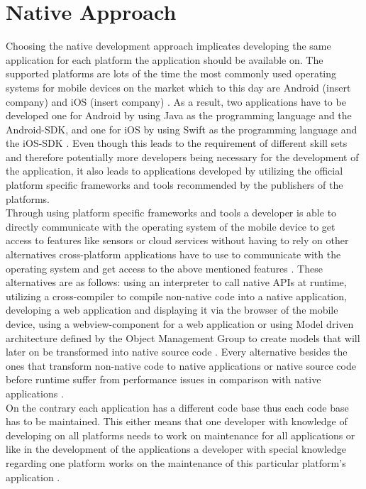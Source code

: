 \documentclass[Bachelor,BIF,english]{twbook}
\begin{document}
\section{Native Approach}
Choosing the native development approach implicates developing the same application for each platform the application should be available on. The supported platforms are lots of the time the most commonly used operating systems for mobile devices on the market which to this day are Android (insert company) and iOS (insert company) \cite[p.~5]{Steczko2016}. As a result, two applications have to be developed one for Android by using Java as the programming language and the Android-SDK, and one for iOS by using Swift as the programming language and the iOS-SDK \cite[p.~5]{LinckArne2016} \cite{AppleGettingStarted}. Even though this leads to the requirement of different skill sets and therefore potentially more developers being necessary for the development of the application, it also leads to applications developed by utilizing the official platform specific frameworks and tools recommended by the publishers of the platforms. 
\\[\baselineskip]
Through using platform specific frameworks and tools a developer is able to directly communicate with the operating system of the mobile device to get access to features like sensors or cloud services without having to rely on other alternatives cross-platform applications have to use to communicate with the operating system and get access to the above mentioned features \cite[p.~6]{LinckArne2016}. These alternatives are as follows: using an interpreter to call native APIs at runtime, utilizing a cross-compiler to compile non-native code into a native application, developing a web application and displaying it via the browser of the mobile device, using a webview-component for a web application or using Model driven architecture defined by the Object Management Group to create models that will later on be transformed into native source code \cite[p.~4--6]{Hansson_Vidhall_2016} \cite[p.~3--5]{LinckArne2016}. Every alternative besides the ones that transform non-native code to native applications or native source code before runtime suffer from performance issues in comparison with native applications \cite[p.~2,~10]{JohanssonSderberg2018} \cite[p.~6]{LinckArne2016} \cite[p.~111]{Keist2016}. 
\\[\baselineskip]
On the contrary each application has a different code base thus each code base has to be maintained. This either means that one developer with knowledge of developing on all platforms needs to work on maintenance for all applications or like in the development of the applications a developer with special knowledge regarding one platform works on the maintenance of this particular platform's application \cite[p.~6]{LinckArne2016}.
\end{document}
